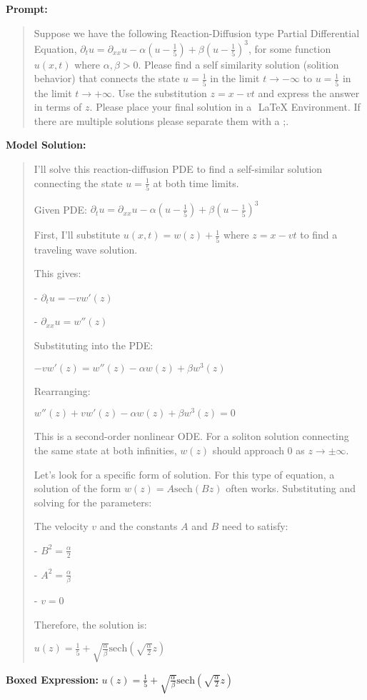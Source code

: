 \documentclass{article}
\begin{document}
\textbf{Prompt:}
\begin{quote}
Suppose we have the following Reaction-Diffusion type Partial Differential Equation, $ \partial_t u = \partial_{xx} u - \alpha (u - \frac{1}{5}) + \beta (u - \frac{1}{5})^3 $, for some function $u(x,t)$ where $\alpha,\beta > 0$. Please find a self similarity solution (solition behavior) that connects the state $u = \frac{1}{5}$ in the limit $t \rightarrow -\infty $ to $u = \frac{1}{5}$ in the limit $t \rightarrow +\infty$. Use the substitution $z=x-vt$ and express the answer in terms of $z$. Please place your final solution in a $\boxed{}$ LaTeX Environment. If there are multiple solutions please separate them with a ;.
\end{quote}
\textbf{Model Solution:}
\begin{quote}
I'll solve this reaction-diffusion PDE to find a self-similar solution connecting the state $u = \frac{1}{5}$ at both time limits.



Given PDE: $\partial_t u = \partial_{xx} u - \alpha (u - \frac{1}{5}) + \beta (u - \frac{1}{5})^3$



First, I'll substitute $u(x,t) = w(z) + \frac{1}{5}$ where $z = x - vt$ to find a traveling wave solution.



This gives:

- $\partial_t u = -v w'(z)$

- $\partial_{xx} u = w''(z)$



Substituting into the PDE:

$-v w'(z) = w''(z) - \alpha w(z) + \beta w^3(z)$



Rearranging:

$w''(z) + v w'(z) - \alpha w(z) + \beta w^3(z) = 0$



This is a second-order nonlinear ODE. For a soliton solution connecting the same state at both infinities, $w(z)$ should approach 0 as $z \to \pm \infty$.



Let's look for a specific form of solution. For this type of equation, a solution of the form $w(z) = A \text{sech}(Bz)$ often works. Substituting and solving for the parameters:



The velocity $v$ and the constants $A$ and $B$ need to satisfy:

- $B^2 = \frac{\alpha}{2}$

- $A^2 = \frac{\alpha}{\beta}$

- $v = 0$



Therefore, the solution is:



$\boxed{u(z) = \frac{1}{5} + \sqrt{\frac{\alpha}{\beta}} \text{sech}\left(\sqrt{\frac{\alpha}{2}}z\right)}$
\end{quote}
\textbf{Boxed Expression:} $u(z) = \frac{1}{5} + \sqrt{\frac{\alpha}{\beta}} \text{sech}\left(\sqrt{\frac{\alpha}{2}}z\right)$
\end{document}
